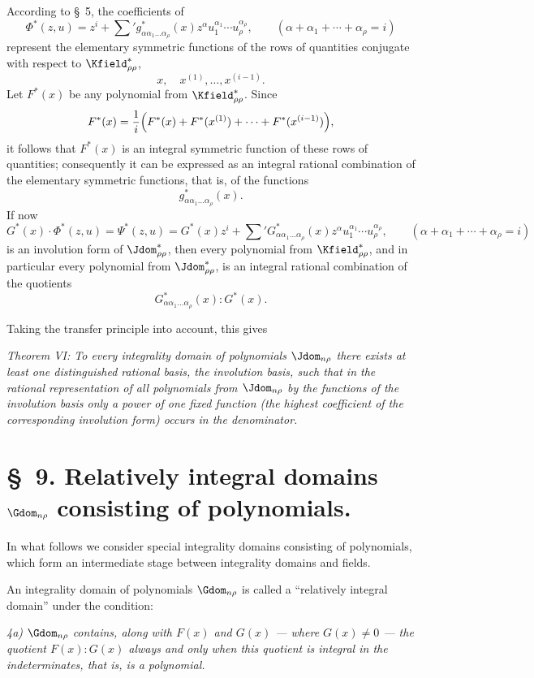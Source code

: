 \documentclass[11pt]{article}
\begin{document}
According to \S\ 5, the coefficients of
\[
  \Phi^*(z,u)=z^i+\sum{}' g^*_{\alpha\alpha_1\ldots\alpha_\rho}(x)
  z^\alpha u_1^{\alpha_1}\cdots u_\rho^{\alpha_\rho},
  \qquad
  (\alpha+\alpha_1+\cdots+\alpha_\rho=i)
\]
represent the elementary symmetric functions of the rows of quantities conjugate with respect to $\Kfield^*_{\rho\rho}$,
\[
  x,\quad x^{(1)},\ldots,x^{(i-1)}.
\]
Let $F^*(x)$ be any polynomial from $\Kfield^*_{\rho\rho}$. Since
\[
  F^*(x)=\frac1i\Bigl(F^*(x)+F^*(x^{(1)})+
  \cdots+F^*(x^{(i-1)})\Bigr),
\]
it follows that $F^*(x)$ is an integral symmetric function of these rows of quantities; consequently it can be expressed as an integral rational combination of the elementary symmetric functions, that is, of the functions
\[
  g^*_{\alpha\alpha_1\ldots\alpha_\rho}(x).
\]
If now
\[
  G^*(x)\cdot\Phi^*(z,u)=\Psi^*(z,u)
  =G^*(x)z^i+
  \sum{}'G^*_{\alpha\alpha_1\ldots\alpha_\rho}(x)
  z^\alpha u_1^{\alpha_1}\cdots u_\rho^{\alpha_\rho},
  \qquad
  (\alpha+\alpha_1+\cdots+\alpha_\rho=i)
\]
is an involution form of $\Jdom^*_{\rho\rho}$, then every polynomial from $\Kfield^*_{\rho\rho}$, and in particular every polynomial from $\Jdom^*_{\rho\rho}$, is an integral rational combination of the quotients
\[
  G^*_{\alpha\alpha_1\ldots\alpha_\rho}(x):G^*(x).
\]

Taking the transfer principle into account, this gives

\emph{Theorem VI: To every integrality domain of polynomials $\Jdom_{n\rho}$ there exists at least one distinguished rational basis, the involution basis, such that in the rational representation of all polynomials from $\Jdom_{n\rho}$ by the functions of the involution basis only a power of one fixed function (the highest coefficient of the corresponding involution form) occurs in the denominator.}

\section*{\S\ 9. Relatively integral domains $\Gdom_{n\rho}$ consisting of polynomials.}

In what follows we consider special integrality domains consisting of polynomials, which form an intermediate stage between integrality domains and fields.

An integrality domain of polynomials $\Gdom_{n\rho}$ is called a ``relatively integral domain'' under the condition:

\emph{4a) $\Gdom_{n\rho}$ contains, along with $F(x)$ and $G(x)$ --- where $G(x)\ne0$ --- the quotient $F(x):G(x)$ always and only when this quotient is integral in the indeterminates, that is, is a polynomial.}
\end{document}
